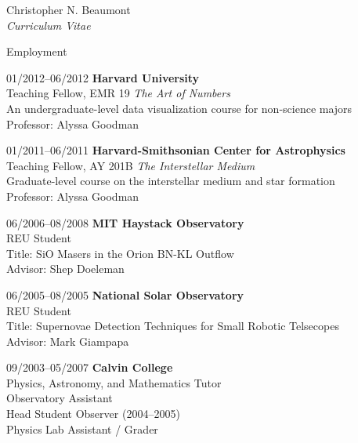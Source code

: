 \documentclass[10pt]{article}
\begin{document}
\begin{cv}{Christopher N. Beaumont\\{\large \itshape Curriculum Vitae}}
\begin{cvlist}{Employment}
	\item[01/2012--06/2012] \textbf{Harvard University} \\
	Teaching Fellow, EMR 19 \textit{The Art of Numbers}\\
	An undergraduate-level data visualization course for non-science majors \\
	Professor: Alyssa Goodman \\

	\item[01/2011--06/2011] \textbf{Harvard-Smithsonian Center for Astrophysics} \\
	Teaching Fellow, AY 201B \textit{The Interstellar Medium} \\
	Graduate-level course on the interstellar medium and star formation \\
	Professor: Alyssa Goodman \\
	
	\item[06/2006--08/2008] \textbf{MIT Haystack Observatory} \\
	REU Student \\
	Title: SiO Masers in the Orion BN-KL Outflow \\
	Advisor: Shep Doeleman \\

	\item[06/2005--08/2005] \textbf{National Solar Observatory} \\
	REU Student \\
	Title:	Supernovae Detection Techniques for Small Robotic Telsecopes \\
	Advisor: Mark Giampapa \\

	\item[09/2003--05/2007] \textbf{Calvin College}\\
	Physics, Astronomy, and Mathematics Tutor \\
	Observatory Assistant \\
	Head Student Observer (2004--2005) \\
	Physics Lab Assistant / Grader \\

\end{cvlist}

\setlength{\oldcvlabelwidth}{\cvlabelwidth}
\setlength{\cvlabelwidth}{1em}
\renewcommand*{\bibindent}{1.5em}
\newcommand*{\biblabelsep}{1.5em}



\end{cv}
\end{document}

